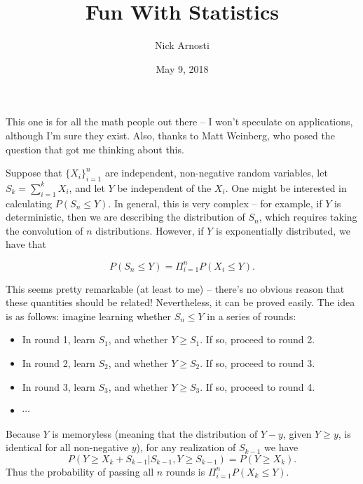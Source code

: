\documentclass[11pt, oneside]{article}   	%
\title{Fun With Statistics}
\author{Nick Arnosti}
\date{May 9, 2018}							%
\begin{document}
\maketitle



This one is for all the math people out there -- I won't speculate on applications, although I'm sure they exist. Also, thanks to Matt Weinberg, who posed the question that got me thinking about this.

Suppose that $\{X_i\}_{i = 1}^n$ are independent, non-negative random variables, let $S_k = \sum_{i = 1}^k X_i$, and let $Y$ be independent of the $X_i$. One might be interested in calculating $P(S_n \leq Y)$. In general, this is very complex -- for example, if $Y$ is deterministic, then we are describing the distribution of $S_n$, which requires taking the convolution of $n$ distributions. However, if $Y$ is exponentially distributed, we have that

\begin{equation}P(S_n \leq Y) = \Pi_{i = 1}^n P(X_i \leq Y).\end{equation}

This seems pretty remarkable (at least to me) -- there's no obvious reason that these quantities should be related! Nevertheless, it can be proved easily. The idea is as follows: imagine learning whether $S_n \leq Y$ in a series of rounds:
\begin{itemize}
\item In round 1, learn $S_1$, and whether $Y \geq S_1$. If so, proceed to round 2.
\item In round 2, learn $S_2$, and whether $Y \geq S_2$. If so, proceed to round 3.
\item In round 3, learn $S_3$, and whether $Y \geq S_3$. If so, proceed to round 4.
\item $\cdots$
\end{itemize}
Because $Y$ is memoryless  (meaning that the distribution of $Y-y$, given $Y \geq y$, is identical for all non-negative $y$), for any realization of $S_{k-1}$ we have
\begin{equation} P(Y \geq X_k + S_{k-1} \vert S_{k-1}, Y \geq S_{k-1}) = P(Y \geq X_k). \label{eq:memoryless} \end{equation}
Thus the probability of passing all $n$ rounds is $\Pi_{i = 1}^n P(X_k \leq Y)$.
\end{document}
